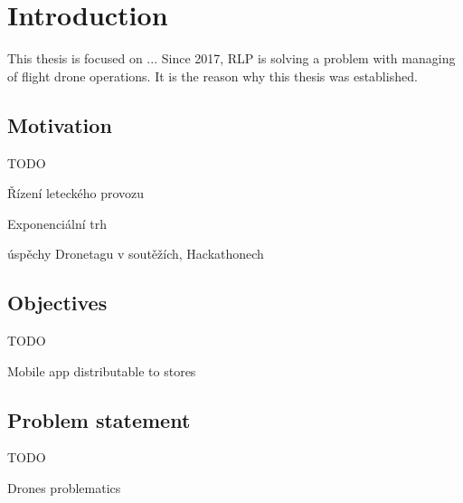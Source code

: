 \chapter{Introduction}\label{ch:introduction}
This thesis is focused on ...
Since 2017, RLP is solving a problem with managing of flight drone operations.
It is the reason why this thesis was established.

\section{Motivation}\label{sec:motivation}
TODO

Řízení leteckého provozu

Exponenciální trh

úspěchy Dronetagu v soutěžích, Hackathonech


\section{Objectives}\label{sec:objectives}
TODO

Mobile app distributable to stores

\section{Problem statement}\label{sec:problem-statement}
TODO

Drones problematics